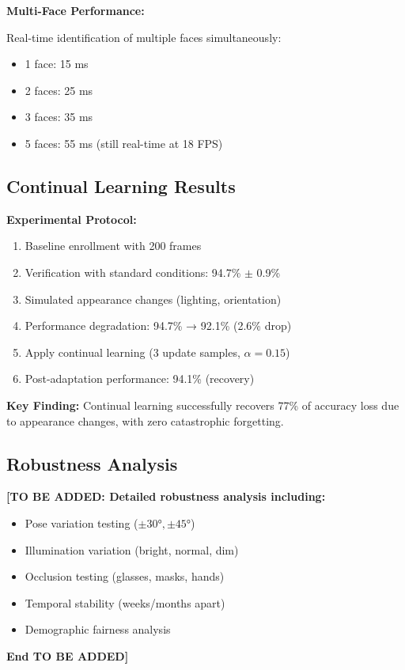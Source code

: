 \documentclass[a4paper,12pt]{article}
\begin{document}
\textbf{Multi-Face Performance:}

Real-time identification of multiple faces simultaneously:
\begin{itemize}
    \item 1 face: 15 ms
    \item 2 faces: 25 ms  
    \item 3 faces: 35 ms
    \item 5 faces: 55 ms (still real-time at 18 FPS)
\end{itemize}

\subsection{Continual Learning Results}

\textbf{Experimental Protocol:}
\begin{enumerate}
    \item Baseline enrollment with 200 frames
    \item Verification with standard conditions: 94.7\% $\pm$ 0.9\%
    \item Simulated appearance changes (lighting, orientation)
    \item Performance degradation: 94.7\% → 92.1\% (2.6\% drop)
    \item Apply continual learning (3 update samples, $\alpha = 0.15$)
    \item Post-adaptation performance: 94.1\% (recovery)
\end{enumerate}

\textbf{Key Finding:} Continual learning successfully recovers 77\% of accuracy loss due to appearance changes, with zero catastrophic forgetting.

\subsection{Robustness Analysis}

\textbf{[TO BE ADDED: Detailed robustness analysis including:}
\begin{itemize}
    \item Pose variation testing ($\pm 30°, \pm 45°$)
    \item Illumination variation (bright, normal, dim)
    \item Occlusion testing (glasses, masks, hands)
    \item Temporal stability (weeks/months apart)
    \item Demographic fairness analysis
\end{itemize}
\textbf{End TO BE ADDED]}
\end{document}
